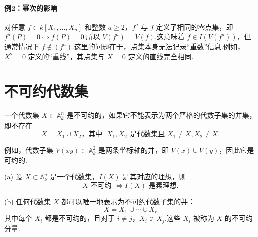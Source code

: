 \paragraph{例2：幂次的影响} 对任意 \(f \in  k\left\lbrack  {{X}_{1},\ldots ,{X}_{n}}\right\rbrack\) 和整数 \(a \geq  2\)，\({f}^{a}\) 与 \(f\) 定义了相同的零点集，即 \({f}^{a}\left( P\right)  = 0 \Leftrightarrow  f\left( P\right)  = 0\).所以 \(V\left( {f}^{a}\right)  = V\left( f\right)\).这意味着 \(f \in  I\left( {V\left( {f}^{a}\right) }\right)\)，但通常情况下 \(f \notin  \left( {f}^{a}\right)\).这里的问题在于，点集本身无法记录“重数”信息.例如，\({X}^{2} = 0\) 定义的“重线”，其点集与 \({X} = 0\) 定义的直线完全相同.

\section{不可约代数集}

\begin{definition}[不可约]
一个代数集 \(X \subset  {\mathbb{A}}_{k}^{n}\) 是不可约的，如果它不能表示为两个严格的代数子集的并集，即不存在
\[
X = {X}_{1} \cup  {X}_{2}\text{，其中 }\;{X}_{1},{X}_{2} \text{ 是代数集且 } {X}_{1} \neq X, {X}_{2} \neq X.
\]
\end{definition}
例如，代数子集 \(V\left( {xy}\right)  \subset  {\mathbb{A}}_{k}^{2}\) 是两条坐标轴的并，即 \(V\left( x\right) \cup V\left( y\right)\)，因此它是可约的.

\begin{proposition}
(a) 设 \(X \subset  {\mathbb{A}}_{k}^{n}\) 是一个代数集，\(I\left( X\right)\) 是其对应的理想，则
\[
X\text{ 不可约 } \Leftrightarrow  I\left( X\right) \text{ 是素理想.}
\]

(b) 任何代数集 \(X\) 都可以唯一地表示为不可约代数子集的并：
\[
X = {X}_{1} \cup  \cdots  \cup  {X}_{r}
\]
其中每个 \({X}_{i}\) 都是不可约的，且对于 \(i \neq  j\)，\({X}_{i} \not\subset {X}_{j}\).这些 \({X}_{i}\) 被称为 \(X\) 的不可约分量.
\end{proposition}


